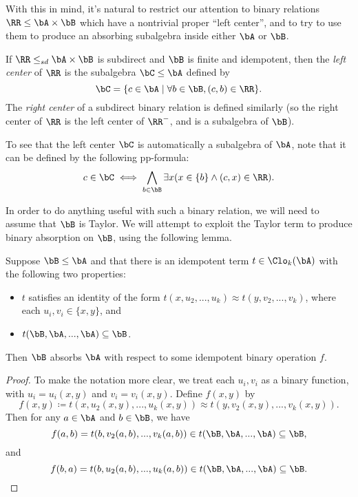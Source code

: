 With this in mind, it's natural to restrict our attention to binary relations $\RR \le \bA \times \bB$ which have a nontrivial proper ``left center'', and to try to use them to produce an absorbing subalgebra inside either $\bA$ or $\bB$.

\begin{defn} If $\RR \le_{sd} \bA \times \bB$ is subdirect and $\bB$ is finite and idempotent, then the \emph{left center} of $\RR$ is the subalgebra $\bC \le \bA$ defined by
\[
\bC = \{c \in \bA \mid \forall b \in \bB, (c,b) \in \RR\}.
\]
The \emph{right center} of a subdirect binary relation is defined similarly (so the right center of $\RR$ is the left center of $\RR^-$, and is a subalgebra of $\bB$).
\end{defn}

To see that the left center $\bC$ is automatically a subalgebra of $\bA$, note that it can be defined by the following pp-formula:
\[
c \in \bC \iff \bigwedge_{b \in \bB} \exists x (x \in \{b\} \wedge (c,x) \in \RR).
\]

In order to do anything useful with such a binary relation, we will need to assume that $\bB$ is Taylor. We will attempt to exploit the Taylor term to produce binary absorption on $\bB$, using the following lemma.

\begin{lem} Suppose $\bB \le \bA$ and that there is an idempotent term $t \in \Clo_k(\bA)$ with the following two properties:
\begin{itemize}
\item $t$ satisfies an identity of the form $t(x,u_2,...,u_k) \approx t(y,v_2,...,v_k)$, where each $u_i,v_i \in \{x,y\}$, and
\item $t(\bB, \bA, ..., \bA) \subseteq \bB$.
\end{itemize}
Then $\bB$ absorbs $\bA$ with respect to some idempotent binary operation $f$.
\end{lem}
\begin{proof} To make the notation more clear, we treat each $u_i,v_i$ as a binary function, with $u_i = u_i(x,y)$ and $v_i = v_i(x,y)$. Define $f(x,y)$ by
\[
f(x,y) \coloneqq t(x,u_2(x,y),...,u_k(x,y)) \approx t(y,v_2(x,y),...,v_k(x,y)).
\]
Then for any $a \in \bA$ and $b \in \bB$, we have
\[
f(a,b) = t(b,v_2(a,b),...,v_k(a,b)) \in t(\bB,\bA,...,\bA) \subseteq \bB,
\]
and
\[
f(b,a) = t(b,u_2(a,b),...,u_k(a,b)) \in t(\bB,\bA,...,\bA) \subseteq \bB.\qedhere
\]
\end{proof}

